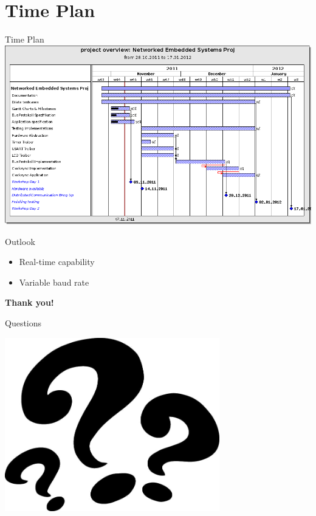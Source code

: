 \documentclass{beamer}
\begin{document}
\section{Time Plan}
\begin{frame}{Time Plan}
\includegraphics[width=1.0\textwidth]{./images/201111_ganttchart.png}
\vspace{1cm}
\end{frame}


\begin{frame}{Outlook}
\begin{center}
    \begin{itemize}
      \item Real-time capability
      \item Variable baud rate
    \end{itemize}
\end{center}
\end{frame}


\begin{frame}
\begin{center}
\begin{Huge}\textbf{Thank you!}\end{Huge}
\end{center}
\end{frame}


\begin{frame}{Questions}
\begin{center}
\includegraphics[width=0.7\textwidth]{./images/question-marks.png}
\end{center}
\end{frame}
\end{document}
